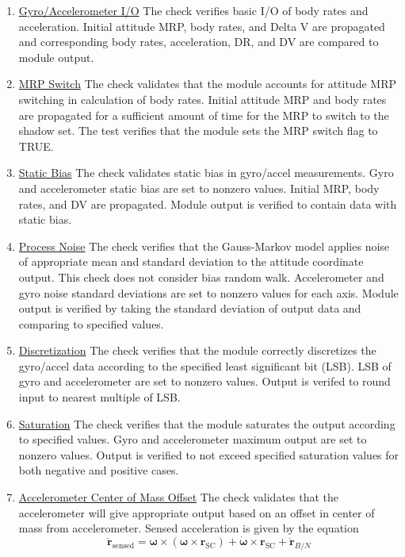 \documentclass[]{BasiliskReportMemo}
\begin{document}
\begin{enumerate}
	\item \underline{Gyro/Accelerometer I/O} The check verifies basic I/O of body rates and acceleration. Initial attitude MRP, body rates, and Delta V are propagated and corresponding body rates, acceleration, DR, and DV are compared to module output.
	\item \underline{MRP Switch} The check validates that the module accounts for attitude MRP switching in calculation of body rates. Initial attitude MRP and body rates are propagated for a sufficient amount of time for the MRP to switch to the shadow set. The test verifies that the module sets the MRP switch flag to TRUE.
	\item \underline{Static Bias} The check validates static bias in gyro/accel measurements. Gyro and accelerometer static bias are set to nonzero values. Initial MRP, body rates, and DV are propagated. Module output is verified to contain data with static bias.
	\item \underline{Process Noise} The check verifies that the Gauss-Markov model applies noise of appropriate mean and standard deviation to the attitude coordinate output. This check does not consider bias random walk. Accelerometer and gyro noise standard deviations are set to nonzero values for each axis. Module output is verified by taking the standard deviation of output data and comparing to specified values.
	\item \underline{Discretization} The check verifies that the module correctly discretizes the gyro/accel data according to the specified least significant bit (LSB). LSB of gyro and accelerometer are set to nonzero values. Output is verifed to round input to nearest multiple of LSB.
	\item \underline{Saturation} The check verifies that the module saturates the output according to specified values. Gyro and accelerometer maximum output are set to nonzero values. Output is verified to not exceed specified saturation values for both negative and positive cases.
	\item \underline{Accelerometer Center of Mass Offset} The check validates that the accelerometer will give appropriate output based on an offset in center of mass from accelerometer. Sensed acceleration is given by the equation
	\begin{equation}
	\ddot{\bm r}_\mathrm{sensed} = \bm\omega \times (\bm\omega \times \bm r_{\mathrm{SC}}) + \dot{\bm\omega} \times \bm r_{\mathrm{SC}} + \ddot{\bm r}_{B/N}
	\end{equation}

\end{enumerate}
\end{document}
